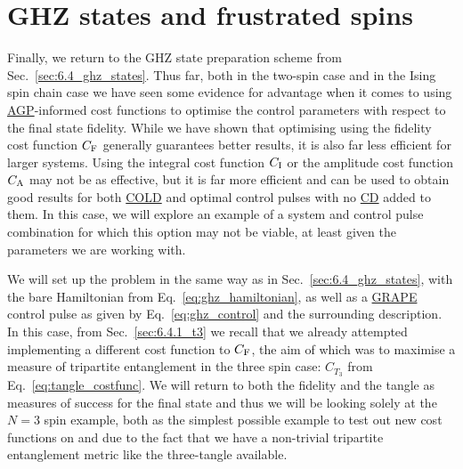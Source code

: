 \documentclass[a4paper,oneside,11pt]{book}
\newcommand{\acrref}[1]{\hyperref[acr:#1]{#1}}
\begin{document}
\section{GHZ states and frustrated spins}\label{sec:7.3_ghz_ho}

Finally, we return to the GHZ state preparation scheme from Sec.~\ref{sec:6.4_ghz_states}. Thus far, both in the two-spin case and in the Ising spin chain case we have seen some evidence for advantage when it comes to using \acrref{AGP}-informed cost functions to optimise the control parameters with respect to the final state fidelity. While we have shown that optimising using the fidelity cost function $C_{\rm F}$ generally guarantees better results, it is also far less efficient for larger systems. Using the integral cost function $C_{\rm I}$ or the amplitude cost function $C_{\rm A}$ may not be as effective, but it is far more efficient and can be used to obtain good results for both \acrref{COLD} and optimal control pulses with no \acrref{CD} added to them. In this case, we will explore an example of a system and control pulse combination for which this option may not be viable, at least given the parameters we are working with.

We will set up the problem in the same way as in Sec.~\ref{sec:6.4_ghz_states}, with the bare Hamiltonian from Eq.~\eqref{eq:ghz_hamiltonian}, as well as a \acrref{GRAPE} control pulse as given by Eq.~\eqref{eq:ghz_control} and the surrounding description. In this case, from Sec.~\ref{sec:6.4.1_t3} we recall that we already attempted implementing a different cost function to $C_{\rm F}$, the aim of which was to maximise a measure of tripartite entanglement in the three spin case: $C_{T_3}$ from Eq.~\eqref{eq:tangle_costfunc}. We will return to both the fidelity and the tangle as measures of success for the final state and thus we will be looking solely at the $N=3$ spin example, both as the simplest possible example to test out new cost functions on and due to the fact that we have a non-trivial tripartite entanglement metric like the three-tangle available.
\end{document}
